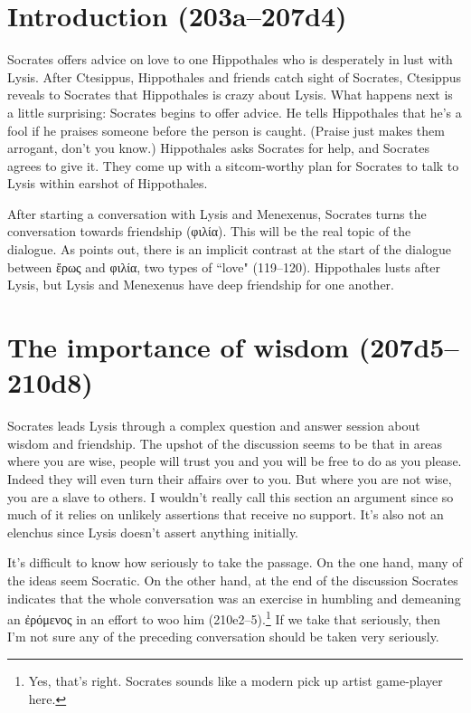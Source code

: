 \documentclass[11pt]{article}
\begin{document}
\section{Introduction (203a--207d4)}

Socrates offers advice on love to one Hippothales who is desperately in lust with Lysis.  After Ctesippus, Hippothales and friends catch sight of Socrates, Ctesippus reveals to Socrates that Hippothales is crazy about Lysis.  What happens next is a little surprising: Socrates begins to offer advice.  He tells Hippothales that he's a fool if he praises someone before the person is caught.  (Praise just makes them arrogant, don't you know.)  Hippothales asks Socrates for help, and Socrates agrees to give it.  They come up with a sitcom-worthy plan for Socrates to talk to Lysis within earshot of Hippothales.

After starting a conversation with Lysis and Menexenus, Socrates turns the conversation towards friendship (φιλία).  This will be the real topic of the dialogue.  As \citet{watt1987} points out, there is an implicit contrast at the start of the dialogue between ἔρως and φιλία, two types of ``love" (119--120).  Hippothales lusts after Lysis, but Lysis and Menexenus have deep friendship for one another.

\section{The importance of wisdom (207d5--210d8)}

Socrates leads Lysis through a complex question and answer session about wisdom and friendship.  The upshot of the discussion seems to be that in areas where you are wise, people will trust you and you will be free to do as you please.  Indeed they will even turn their affairs over to you.  But where you are not wise, you are a slave to others.  I wouldn't really call this section an argument since so much of it relies on unlikely assertions that receive no support.  It's also not an elenchus since Lysis doesn't assert anything initially.

It's difficult to know how seriously to take the passage.  On the one hand, many of the ideas seem Socratic.  On the other hand, at the end of the discussion Socrates indicates that the whole conversation was an exercise in humbling and demeaning an ἐρόμενος in an effort to woo him (210e2--5).\footnote{Yes, that's right.  Socrates sounds like a modern pick up artist game-player here.}  If we take that seriously, then I'm not sure any of the preceding conversation should be taken very seriously.
\end{document}
